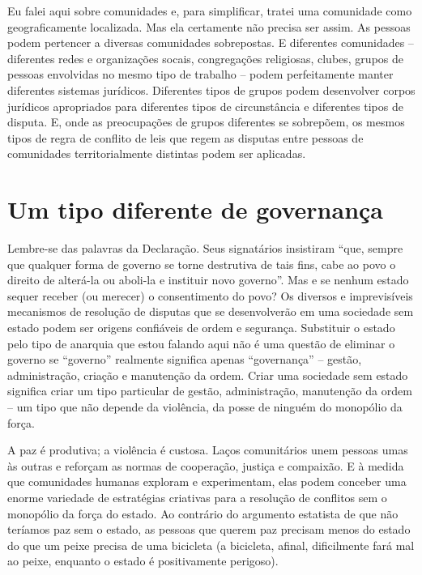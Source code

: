Eu falei aqui sobre comunidades e, para simplificar, tratei uma comunidade como geograficamente localizada. Mas ela certamente não precisa ser assim. As pessoas podem pertencer a diversas comunidades sobrepostas. E diferentes comunidades -- diferentes redes e organizações socais, congregações religiosas, clubes, grupos de pessoas envolvidas no mesmo tipo de trabalho -- podem perfeitamente manter diferentes sistemas jurídicos. Diferentes tipos de grupos podem desenvolver corpos jurídicos apropriados para diferentes tipos de circunstância e diferentes tipos de disputa. E, onde as preocupações de grupos diferentes se sobrepõem, os mesmos tipos de regra de conflito de leis que regem as disputas entre pessoas de comunidades territorialmente distintas podem ser aplicadas.

\section{Um tipo diferente de governança}

Lembre-se das palavras da Declaração. Seus signatários insistiram ``que, sempre que qualquer forma de governo se torne destrutiva de tais fins, cabe ao povo o direito de alterá-la ou aboli-la e instituir novo governo''. Mas e se nenhum estado sequer receber (ou merecer) o consentimento do povo? Os diversos e imprevisíveis mecanismos de resolução de disputas que se desenvolverão em uma sociedade sem estado podem ser origens confiáveis de ordem e segurança. Substituir o estado pelo tipo de anarquia que estou falando aqui não é uma questão de eliminar o governo se ``governo'' realmente significa apenas ``governança'' -- gestão, administração, criação e manutenção da ordem. Criar uma sociedade sem estado significa criar um tipo particular de gestão, administração, manutenção da ordem -- um tipo que não depende da violência, da posse de ninguém do monopólio da força.

A paz é produtiva; a violência é custosa. Laços comunitários unem pessoas umas às outras e reforçam as normas de cooperação, justiça e compaixão. E à medida que comunidades humanas exploram e experimentam, elas podem conceber uma enorme variedade de estratégias criativas para a resolução de conflitos sem o monopólio da força do estado. Ao contrário do argumento estatista de que não teríamos paz sem o estado, as pessoas que querem paz precisam menos do estado do que um peixe precisa de uma bicicleta (a bicicleta, afinal, dificilmente fará mal ao peixe, enquanto o estado é positivamente perigoso).

